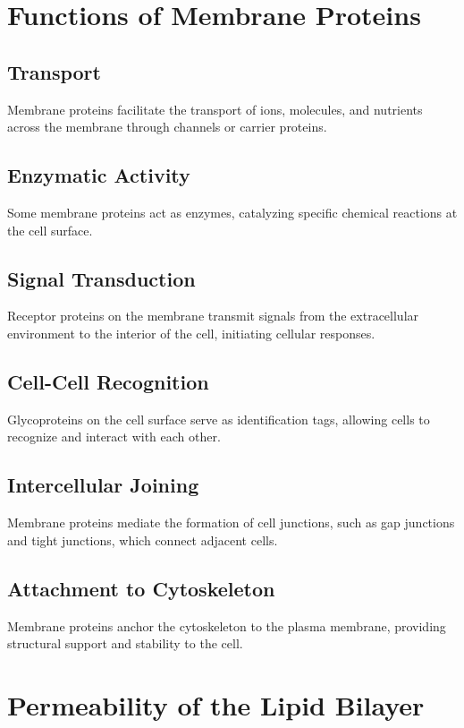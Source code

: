 \documentclass{article}
\begin{document}
\section{Functions of Membrane Proteins}

\subsection{Transport}
Membrane proteins facilitate the transport of ions, molecules, and nutrients across the membrane through channels or carrier proteins.

\subsection{Enzymatic Activity}
Some membrane proteins act as enzymes, catalyzing specific chemical reactions at the cell surface.

\subsection{Signal Transduction}
Receptor proteins on the membrane transmit signals from the extracellular environment to the interior of the cell, initiating cellular responses.

\subsection{Cell-Cell Recognition}
Glycoproteins on the cell surface serve as identification tags, allowing cells to recognize and interact with each other.

\subsection{Intercellular Joining}
Membrane proteins mediate the formation of cell junctions, such as gap junctions and tight junctions, which connect adjacent cells.

\subsection{Attachment to Cytoskeleton}
Membrane proteins anchor the cytoskeleton to the plasma membrane, providing structural support and stability to the cell.

\section{Permeability of the Lipid Bilayer}
\end{document}
